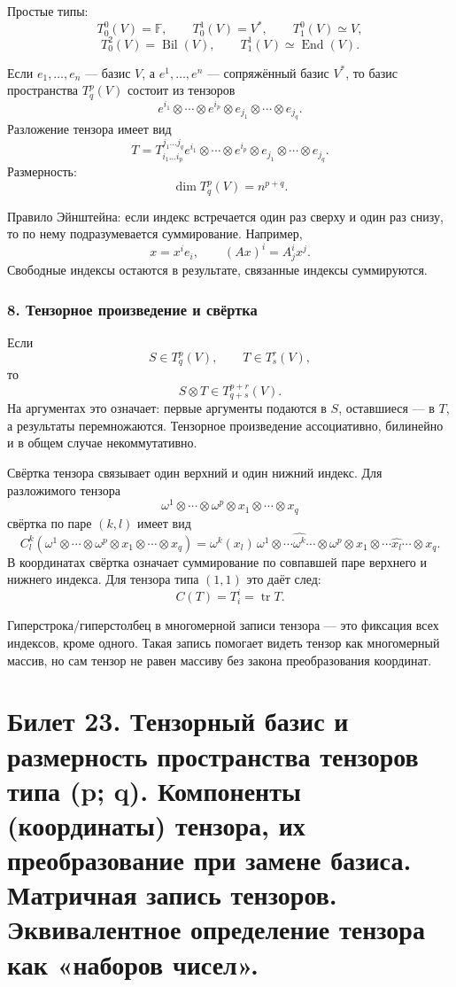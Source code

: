 \documentclass[12pt,a4paper]{article}
\theoremstyle{definition}
\theoremstyle{plain}
\theoremstyle{remark}
\newcommand{\F}{\mathbb{F}}
\newcommand{\End}{\operatorname{End}}
\providecommand{\tr}{\operatorname{tr}}
\begin{document}
Простые типы:
\[
    T^0_0(V)=\F,
    \qquad
    T^1_0(V)=V^*,
    \qquad
    T^0_1(V)\simeq V,
\]
\[
    T^2_0(V)=\operatorname{Bil}(V),
    \qquad
    T^1_1(V)\simeq \End(V).
\]

Если $e_1,\ldots,e_n$ --- базис $V$, а $e^1,\ldots,e^n$ --- сопряжённый базис $V^*$, то базис пространства $T^p_q(V)$ состоит из тензоров
\[
    e^{i_1}\otimes\cdots\otimes e^{i_p}\otimes e_{j_1}\otimes\cdots\otimes e_{j_q}.
\]
Разложение тензора имеет вид
\[
    T=T^{j_1\ldots j_q}_{i_1\ldots i_p}
      e^{i_1}\otimes\cdots\otimes e^{i_p}\otimes e_{j_1}\otimes\cdots\otimes e_{j_q}.
\]
Размерность:
\[
    \dim T^p_q(V)=n^{p+q}.
\]

Правило Эйнштейна: если индекс встречается один раз сверху и один раз снизу, то по нему подразумевается суммирование.
Например,
\[
    x=x^i e_i,
    \qquad
    (Ax)^i=A^i_j x^j.
\]
Свободные индексы остаются в результате, связанные индексы суммируются.

\subsubsection*{8. Тензорное произведение и свёртка}
Если
\[
    S\in T^p_q(V),
    \qquad
    T\in T^r_s(V),
\]
то
\[
    S\otimes T\in T^{p+r}_{q+s}(V).
\]
На аргументах это означает: первые аргументы подаются в $S$, оставшиеся --- в $T$, а результаты перемножаются.
Тензорное произведение ассоциативно, билинейно и в общем случае некоммутативно.

Свёртка тензора связывает один верхний и один нижний индекс.
Для разложимого тензора
\[
    \omega^1\otimes\cdots\otimes\omega^p\otimes x_1\otimes\cdots\otimes x_q
\]
свёртка по паре $(k,l)$ имеет вид
\[
    C^k_l(\omega^1\otimes\cdots\otimes\omega^p\otimes x_1\otimes\cdots\otimes x_q)
    =\omega^k(x_l)\,
      \omega^1\otimes\cdots\widehat{\omega^k}\cdots\otimes\omega^p
      \otimes
      x_1\otimes\cdots\widehat{x_l}\cdots\otimes x_q.
\]
В координатах свёртка означает суммирование по совпавшей паре верхнего и нижнего индекса.
Для тензора типа $(1,1)$ это даёт след:
\[
    C(T)=T^i_i=\tr T.
\]

Гиперстрока/гиперстолбец в многомерной записи тензора --- это фиксация всех индексов, кроме одного. Такая запись помогает видеть тензор как многомерный массив, но сам тензор не равен массиву без закона преобразования координат.

\clearpage

\section{Билет 23. Тензорный базис и размерность пространства тензоров типа (p; q). Компоненты (координаты) тензора, их преобразование при замене базиса. Матричная запись тензоров. Эквивалентное определение тензора как «наборов чисел».}
\end{document}
